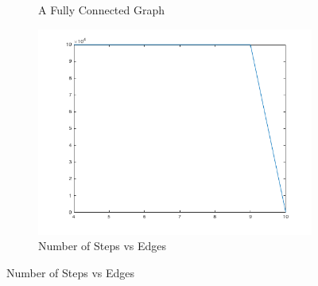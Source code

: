 \documentclass{article}
\begin{document}
\begin{figure}[h!]
\begin{subfigure}[t]{0.3\textwidth}
\caption{A Fully Connected Graph}
\end{subfigure}
\begin{subfigure}[t]{0.3\textwidth}
\centering
\includegraphics[width=\textwidth]{pi-om0-9-conv.png}
\caption{Number of Steps vs Edges}
\end{subfigure}
\end{figure}
\end{document}
